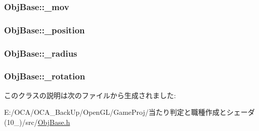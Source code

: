 \hypertarget{class_obj_base_a510356ecd15d213ac818b836f9b25cca}{
\subsubsection[{\-\_\-mov}]{ Obj\-Base\-::\-\_\-mov\hspace{0.3cm}{\ttfamily [protected]}}}\label{class_obj_base_a510356ecd15d213ac818b836f9b25cca}
\hypertarget{class_obj_base_a686e86c74461bf6cea312434796a57ce}{
\subsubsection[{\-\_\-position}]{ Obj\-Base\-::\-\_\-position\hspace{0.3cm}{\ttfamily [protected]}}}\label{class_obj_base_a686e86c74461bf6cea312434796a57ce}
\hypertarget{class_obj_base_a6f8144cf79c29670f6697833c021dd06}{
\subsubsection[{\-\_\-radius}]{ Obj\-Base\-::\-\_\-radius\hspace{0.3cm}{\ttfamily [protected]}}}\label{class_obj_base_a6f8144cf79c29670f6697833c021dd06}
\hypertarget{class_obj_base_a7f5b5aa7c370afcc110a6bf571f45375}{
\subsubsection[{\-\_\-rotation}]{ Obj\-Base\-::\-\_\-rotation\hspace{0.3cm}{\ttfamily [protected]}}}\label{class_obj_base_a7f5b5aa7c370afcc110a6bf571f45375}


このクラスの説明は次のファイルから生成されました\-:\begin{DoxyCompactItemize}
\item 
E\-:/\-O\-C\-A/\-O\-C\-A\-\_\-\-Back\-Up/\-Open\-G\-L/\-Game\-Proj/当たり判定と職種作成とシェーダ(10\-\_)/src/\hyperlink{_obj_base_8h}{Obj\-Base.\-h}\end{DoxyCompactItemize}
